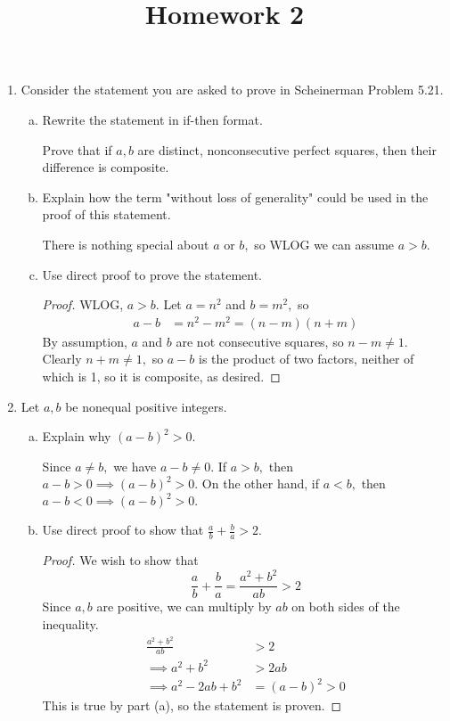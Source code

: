 \documentclass{article}
\begin{document}
\title{Homework 2}
\maketitle
\thispagestyle{fancy}

\begin{enumerate}
	\item Consider the statement you are asked to prove in Scheinerman Problem 5.21.
		\begin{enumerate}[(a)]
			\item Rewrite the statement in if-then format.
				\begin{answer*}
					Prove that if $a, b$ are distinct, nonconsecutive perfect squares, then their difference is composite.
				\end{answer*}

			\item Explain how the term "without loss of generality" could be used in the proof of this statement. 
				\begin{answer*}
					There is nothing special about $a$ or $b,$ so WLOG we can assume $a>b.$
				\end{answer*}

			\item Use direct proof to prove the statement.
				\begin{proof}
					WLOG, $a>b.$ Let $a=n^2$ and $b=m^2,$ so
					\begin{align*}
						a-b &= n^2-m^2=(n-m)(n+m)
					\end{align*}
					By assumption, $a$ and $b$ are not consecutive squares, so $n-m\neq 1.$ Clearly $n+m\neq 1,$ so $a-b$ is the product of two factors, neither of which is 1, so it is composite, as desired.
				\end{proof}
				
		\end{enumerate}

	\item Let $a, b$ be nonequal positive integers.
		\begin{enumerate}[(a)]
			\item Explain why $(a-b)^2>0.$
				\begin{answer*}
					Since $a\neq b,$ we have $a-b\neq 0.$ If $a>b,$ then $a-b>0\implies (a-b)^2>0.$ On the other hand, if $a<b,$ then $a-b<0\implies (a-b)^2>0.$
				\end{answer*}

			\item Use direct proof to show that $\frac{a}{b}+\frac{b}{a} > 2.$
				\begin{proof}
					We wish to show that
					\[\frac{a}{b}+\frac{b}{a} = \frac{a^2+b^2}{ab} > 2\]
					Since $a, b$ are positive, we can multiply by $ab$ on both sides of the inequality.
					\begin{align*}
						\frac{a^2+b^2}{ab} &> 2 \\
						\implies a^2+b^2 &>2ab \\
						\implies a^2-2ab+b^2&=(a-b)^2>0
					\end{align*}
					This is true by part (a), so the statement is proven.
				\end{proof}
				

\end{enumerate}
\end{enumerate}
\end{document}
